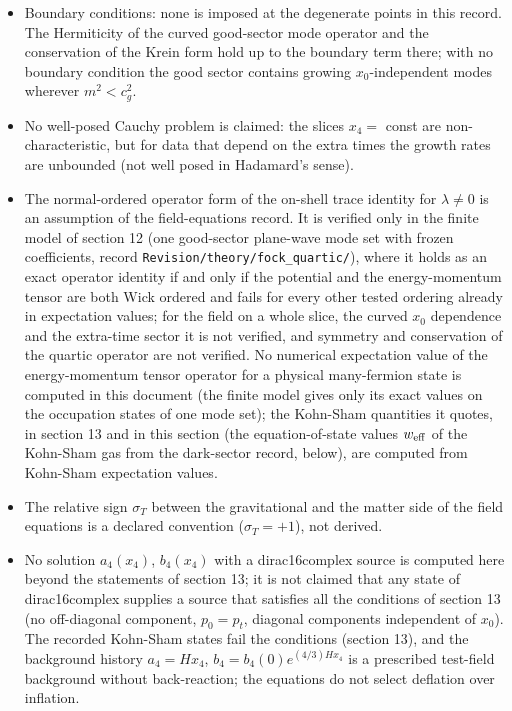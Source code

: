 \documentclass[11pt]{article}
\begin{document}
\begin{itemize}
\item Boundary conditions: none is imposed at the degenerate points in this record. The Hermiticity of the curved good-sector mode operator and the conservation of the Krein form hold up to the boundary term there; with no boundary condition the good sector contains growing $x_0$-independent modes wherever $m^2 < c_g^2$.
\item No well-posed Cauchy problem is claimed: the slices $x_4 = $ const are non-characteristic, but for data that depend on the extra times the growth rates are unbounded (not well posed in Hadamard's sense).
\item The normal-ordered operator form of the on-shell trace identity for $\lambda \neq 0$ is an assumption of the field-equations record. It is verified only in the finite model of section 12 (one good-sector plane-wave mode set with frozen coefficients, record \texttt{Revision\allowbreak{}/theory/\allowbreak{}fock\_qua\allowbreak{}rtic/}), where it holds as an exact operator identity if and only if the potential and the energy-momentum tensor are both Wick ordered and fails for every other tested ordering already in expectation values; for the field on a whole slice, the curved $x_0$ dependence and the extra-time sector it is not verified, and symmetry and conservation of the quartic operator are not verified. No numerical expectation value of the energy-momentum tensor operator for a physical many-fermion state is computed in this document (the finite model gives only its exact values on the occupation states of one mode set); the Kohn-Sham quantities it quotes, in section 13 and in this section (the equation-of-state values $w_{\rm eff}$ of the Kohn-Sham gas from the dark-sector record, below), are computed from Kohn-Sham expectation values.
\item The relative sign $\sigma_T$ between the gravitational and the matter side of the field equations is a declared convention ($\sigma_T = +1$), not derived.
\item No solution $a_4(x_4)$, $b_4(x_4)$ with a dirac16complex source is computed here beyond the statements of section 13; it is not claimed that any state of dirac16complex supplies a source that satisfies all the conditions of section 13 (no off-diagonal component, $p_0 = p_t$, diagonal components independent of $x_0$). The recorded Kohn-Sham states fail the conditions (section 13), and the background history $a_4 = Hx_4$, $b_4 = b_4(0)e^{(4/3)Hx_4}$ is a prescribed test-field background without back-reaction; the equations do not select deflation over inflation.

\end{itemize}
\end{document}
